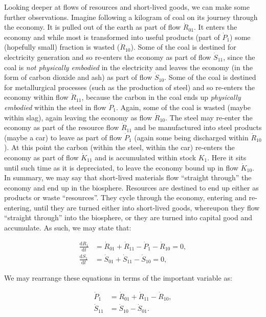 Looking deeper at flows of resources and short-lived goods,
we can make some further observations. 
Imagine following a kilogram of coal on its journey
through the economy. It is pulled out of the earth as part
of flow $\dot{R}_{01}$. 
It enters the economy and while most 
is transformed into useful
products (part of $\dot{P}_{1}$) some (hopefully small)
fraction is wasted ($\dot{R}_{10}$).
Some of the coal is destined for electricity generation
and so re-enters the economy as part of flow $\dot{S}_{11}$,
since the coal is \emph{not physically embodied}
in the electricity and leaves the economy
(in the form of carbon dioxide and ash)
as part of flow $\dot{S}_{10}$.
Some of the coal is destined for metallurgical processes 
(such as the production of steel)
and so re-enters the economy within flow $\dot{R}_{11}$,
because the carbon in the coal ends up 
\emph{physically embodied} within the steel in flow $\dot{P}_{1}$.
Again,
some of the coal is wasted (maybe within slag), 
again leaving the economy as flow $\dot{R}_{10}$.
The steel may re-enter the economy as part of
the resource flow $\dot{R}_{11}$ and be manufactured
into steel products (maybe a car) to leave as part of
flow $\dot{P}_{1}$
(again some being discharged within $\dot{R}_{10}$).
At this point the carbon 
(within the steel, within the car)
re-enters the economy as part of flow $\dot{K}_{11}$
and is accumulated within stock $K_{1}$.
Here it sits until such time as it is depreciated,
to leave the economy bound up in flow $\dot{K}_{10}$.
In summary, we may say that short-lived materials flow 
``straight through'' the economy and end up in the biosphere. 
 Resources are destined
to end up either as products or waste ``resources''.
They cycle through the economy,
entering and re-entering,
until they are turned either into short-lived goods,
whereupon they flow ``straight through'' into the biosphere,
or they are turned into capital good and accumulate.
As such,
we may state that:

\begin{align}
	\frac{\mathrm{d}R_1}{\mathrm{d}t}		&
	= \dot{R}_{01}
	+ \dot{R}_{11}
	- \dot{P}_{1}
	- \dot{R}_{10}
	= 0,															\\
\label{eq:A_S1_balance}
	\frac{\mathrm{d}S_1}{\mathrm{d}t}		&
	= \dot{S}_{01}
	+ \dot{S}_{11}
	- \dot{S}_{10}
	= 0,
\end{align}

We may rearrange these equations in terms of
the important variable as:

\begin{align}
\label{eq:A_P1a}
	\dot{P}_{1}												&
	= \dot{R}_{01}
	+ \dot{R}_{11}
	- \dot{R}_{10}	,										\\									
\label{eq:A_S11}
	\dot{S}_{11}											&
	= \dot{S}_{10}
	- \dot{S}_{01}.
\end{align}


